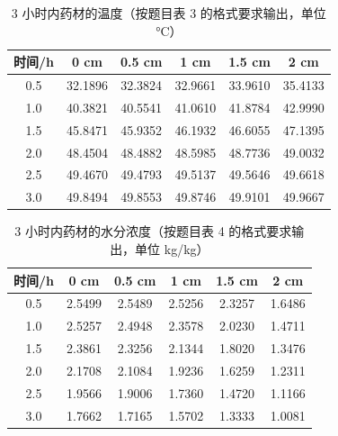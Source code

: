 \begin{table}[H]
\centering
\caption{3 小时内药材的温度（按题目表 3 的格式要求输出，单位 °C）}
\label{tab:q2t}
\begin{tabular}{c|ccccc}
\toprule
时间/h & 0 cm & 0.5 cm & 1 cm & 1.5 cm & 2 cm \\
\midrule
0.5 & 32.1896 & 32.3824 & 32.9661 & 33.9610 & 35.4133 \\
1.0 & 40.3821 & 40.5541 & 41.0610 & 41.8784 & 42.9990 \\
1.5 & 45.8471 & 45.9352 & 46.1932 & 46.6055 & 47.1395 \\
2.0 & 48.4504 & 48.4882 & 48.5985 & 48.7736 & 49.0032 \\
2.5 & 49.4670 & 49.4793 & 49.5137 & 49.5646 & 49.6618 \\
3.0 & 49.8494 & 49.8553 & 49.8746 & 49.9101 & 49.9667 \\
\bottomrule
\end{tabular}
\end{table}

\begin{table}[H]
\centering
\caption{3 小时内药材的水分浓度（按题目表 4 的格式要求输出，单位 kg/kg）}
\label{tab:q2c}
\begin{tabular}{c|ccccc}
\toprule
时间/h & 0 cm & 0.5 cm & 1 cm & 1.5 cm & 2 cm \\
\midrule
0.5 & 2.5499 & 2.5489 & 2.5256 & 2.3257 & 1.6486 \\
1.0 & 2.5257 & 2.4948 & 2.3578 & 2.0230 & 1.4711 \\
1.5 & 2.3861 & 2.3256 & 2.1344 & 1.8020 & 1.3476 \\
2.0 & 2.1708 & 2.1084 & 1.9236 & 1.6259 & 1.2311 \\
2.5 & 1.9566 & 1.9006 & 1.7360 & 1.4720 & 1.1166 \\
3.0 & 1.7662 & 1.7165 & 1.5702 & 1.3333 & 1.0081 \\
\bottomrule
\end{tabular}
\end{table}
